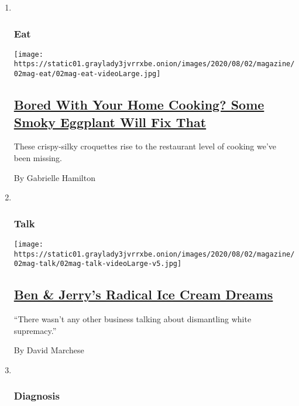 \begin{enumerate}
\def\labelenumi{\arabic{enumi}.}
\item ~
  \hypertarget{eat}{%
  \subsubsection{Eat}\label{eat}}

  \texttt{[image: https://static01.graylady3jvrrxbe.onion/images/2020/08/02/magazine/02mag-eat/02mag-eat-videoLarge.jpg]}

  \hypertarget{bored-with-your-home-cooking-some-smoky-eggplant-will-fix-that}{%
  \subsection{\texorpdfstring{\href{/2020/07/29/magazine/bored-with-your-home-cooking-some-smoky-eggplant-will-fix-that.html}{Bored
  With Your Home Cooking? Some Smoky Eggplant Will Fix
  That}}{Bored With Your Home Cooking? Some Smoky Eggplant Will Fix That}}\label{bored-with-your-home-cooking-some-smoky-eggplant-will-fix-that}}

  These crispy-silky croquettes rise to the restaurant level of cooking
  we've been missing.

  By Gabrielle Hamilton
\item ~
  \hypertarget{talk}{%
  \subsubsection{Talk}\label{talk}}

  \texttt{[image: https://static01.graylady3jvrrxbe.onion/images/2020/08/02/magazine/02mag-talk/02mag-talk-videoLarge-v5.jpg]}

  \hypertarget{ben--jerrys-radical-ice-cream-dreams}{%
  \subsection{\texorpdfstring{\href{/interactive/2020/07/27/magazine/ben-jerry-interview.html}{Ben
  \& Jerry's Radical Ice Cream
  Dreams}}{Ben \& Jerry's Radical Ice Cream Dreams}}\label{ben--jerrys-radical-ice-cream-dreams}}

  ``There wasn't any other business talking about dismantling white
  supremacy.''

  By David Marchese
\item ~
  \hypertarget{diagnosis}{%
  \subsubsection{Diagnosis}\label{diagnosis}}


\end{enumerate}
